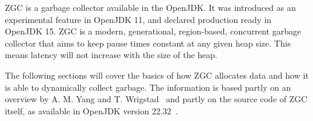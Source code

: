 
ZGC is a garbage collector available in the OpenJDK. It was introduced as an experimental feature in OpenJDK 11, and declared production ready in OpenJDK 15. ZGC is a modern, generational, region-based, concurrent garbage collector that aims to keep pause times constant at any given heap size. This means latency will not increase with the size of the heap.

The following sections will cover the basics of how ZGC allocates data and how it is able to dynamically collect garbage. The information is based partly on an overview by A. M. Yang and T. Wrigstad~\cite{zgc:deep_dive} and partly on the source code of ZGC itself, as available in OpenJDK version 22.32~\cite{jdk:tag2232}.


